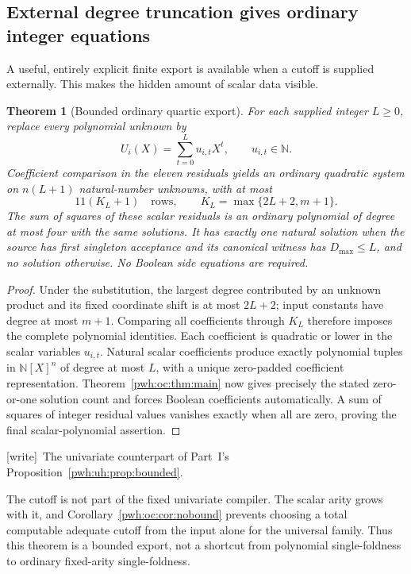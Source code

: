 \documentclass[11pt,letterpaper]{article}
\numberwithin{equation}{section}
\newtheorem{theorem}{Theorem}[section]
\theoremstyle{definition}
\newcommand{\N}{\mathbb N}
\newcommand{\wtag}{\textup{[write]}}
\begin{document}
\subsection{External degree truncation gives ordinary integer equations}

A useful, entirely explicit finite export is available when a cutoff is
supplied externally. This makes the hidden amount of scalar data visible.

\begin{theorem}[Bounded ordinary quartic export]
\label{pwh:oc:thm:boundedexport}
For each supplied integer $L\ge0$, replace every polynomial unknown by
\[
 U_i(X)=\sum_{t=0}^{L}u_{i,t}X^t,\qquad u_{i,t}\in\N.
\]
Coefficient comparison in the eleven residuals yields an ordinary
quadratic system on $n(L+1)$ natural-number unknowns, with at most
\[
 11(K_L+1)\quad\text{rows},\qquad K_L=\max\{2L+2,m+1\}.
\]
The sum of squares of these scalar residuals is an ordinary polynomial
of degree at most four with the same solutions. It has exactly one
natural solution when the source has first singleton acceptance and its
canonical witness has $D_{\max}\le L$, and no solution otherwise.
No Boolean side equations are required.
\end{theorem}

\begin{proof}
Under the substitution, the largest degree contributed by an unknown
product and its fixed coordinate shift is at most $2L+2$; input constants
have degree at most $m+1$. Comparing all coefficients through $K_L$
therefore imposes the complete polynomial identities. Each coefficient
is quadratic or lower in the scalar variables $u_{i,t}$. Natural scalar
coefficients produce exactly polynomial tuples in $\N[X]^n$ of degree
at most $L$, with a unique zero-padded coefficient representation.
Theorem~\ref{pwh:oc:thm:main} now gives precisely the stated zero-or-one
solution count and forces Boolean coefficients automatically.
A sum of squares of integer residual values vanishes exactly when all
are zero, proving the final scalar-polynomial assertion.
\end{proof}

\wtag\ The univariate counterpart of Part~I's
Proposition~\ref{pwh:uh:prop:bounded}.

The cutoff is not part of the fixed univariate compiler. The scalar arity
grows with it, and Corollary~\ref{pwh:oc:cor:nobound} prevents choosing a total
computable adequate cutoff from the input alone for the universal family.
Thus this theorem is a bounded export, not a shortcut from polynomial
single-foldness to ordinary fixed-arity single-foldness.
\end{document}
